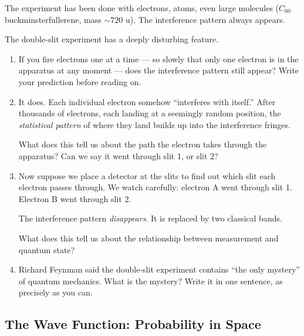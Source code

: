 \documentclass[12pt, a4paper]{book}
\begin{document}
\vspace{0.5em}

The experiment has been done with electrons, atoms, even large
molecules ($C_{60}$ buckminsterfullerene, mass $\sim 720$ u).
The interference pattern always appears.

\begin{puzzlebox}
The double-slit experiment has a deeply disturbing feature.

\begin{enumerate}[label=(\alph*), leftmargin=*]
  \item If you fire electrons one at a time --- so slowly that
        only one electron is in the apparatus at any moment ---
        does the interference pattern still appear?
        Write your prediction before reading on.

  \item It does. Each individual electron somehow ``interferes
        with itself.'' After thousands of electrons, each
        landing at a seemingly random position, the
        \emph{statistical pattern} of where they land builds
        up into the interference fringes.

        What does this tell us about the path the electron
        takes through the apparatus?
        Can we say it went through slit 1, or slit 2?

  \item Now suppose we place a detector at the slits to find
        out which slit each electron passes through.
        We watch carefully: electron A went through slit 1.
        Electron B went through slit 2.

        The interference pattern \emph{disappears}.
        It is replaced by two classical bands.

        What does this tell us about the relationship between
        measurement and quantum state?

  \item Richard Feynman said the double-slit experiment contains
        ``the only mystery'' of quantum mechanics.
        What is the mystery? Write it in one sentence,
        as precisely as you can.
\end{enumerate}
\end{puzzlebox}

\subsection{The Wave Function: Probability in Space}
\end{document}
